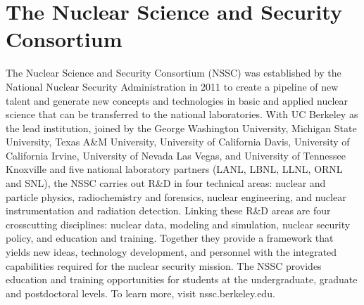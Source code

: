 \section*{The Nuclear Science and Security Consortium}

The Nuclear Science and Security Consortium (NSSC) was established by the National Nuclear Security Administration in 2011 to create a pipeline of new talent and generate new concepts and technologies in basic and applied nuclear science that can be transferred to the national laboratories. 
With UC Berkeley as the lead institution, joined by the George Washington University, Michigan State University, Texas A\&M University, University of California Davis, University of California Irvine, University of Nevada Las Vegas, and University of Tennessee Knoxville and five national laboratory partners (LANL, LBNL, LLNL, ORNL and SNL), the NSSC carries out R\&D in four technical areas: nuclear and particle physics, radiochemistry and forensics, nuclear engineering, and nuclear instrumentation and radiation detection. 
Linking these R\&D areas are four crosscutting disciplines: nuclear data, modeling and simulation, nuclear security policy, and education and training. 
Together they provide a framework that yields new ideas, technology development, and personnel with the integrated capabilities required for the nuclear security mission. 
The NSSC provides education and training opportunities for students at the undergraduate, graduate and postdoctoral levels. 
To learn more, visit nssc.berkeley.edu.

